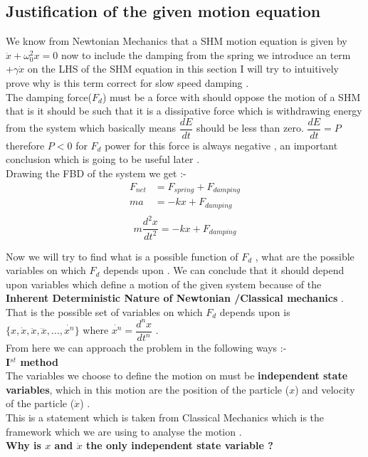 \documentclass[10pt,twoside]{report}
\begin{document}
\subsection{Justification of the given motion equation}\label{Justification of the given motion equation}
We know from Newtonian Mechanics that a \gls{SHM} motion equation is given by $\ddot{x} + \omega_0^2 x = 0 $ now to include the \gls{damping} from the spring we introduce an term $+\gamma\dot{x}$ on the LHS of the SHM equation in this section I will try to intuitively prove why is this term correct for slow speed damping .\\
The damping force($F_d$) must be a force with should oppose the motion of a SHM that is it should be such that it is a dissipative force which is withdrawing energy from the system which basically means $\dfrac{dE}{dt}$ should be less than zero. $\dfrac{dE}{dt} = P$ therefore $P<0$ for $F_d$ power for this force is always negative , an important conclusion which is going to be useful later .\\
 Drawing the \gls{FBD} of the system we get :-
\begin{align*}
    F_{net} &= F_{spring} + F_{damping}\\
    ma      &= -kx + F_{damping}\\
\end{align*}
\begin{equation}
\label{gen_diff_FDO_form}
m\dfrac{d^2x}{dt^2} = -kx +F_{damping}
\end{equation}

Now we will try to find what is a possible function of $F_d$ , what are the possible variables on which $F_d$ depends upon . We can conclude that it should depend upon variables which define a motion of the given system because of the \textbf{\gls{Inherent Deterministic Nature of Newtonian /Classical mechanics}} . That is the possible set of variables on which $F_d$ depends upon is $ \{ x , \dot{x}, \ddot{x} , \dddot{x} , \ldots ,\dot{x^n} \} $ where $\dot{x^n} = \dfrac{d^nx}{dt^n} $ .\\
From here we can approach the problem in the following ways :-\\

\textbf{I$^{st}$ method}\\

 The variables we choose to define the motion on must be \textbf{\gls{independent state variables}}, which in this motion are the position of the particle ($x$) and velocity of the particle ($\dot{x}$) .\\This is a statement which is taken from \gls{Classical Mechanics} which is the framework which we are using to analyse the motion .\\
 \textbf{Why is $x$ and $\dot{x}$ the only independent state variable ?}
 
\end{document}
